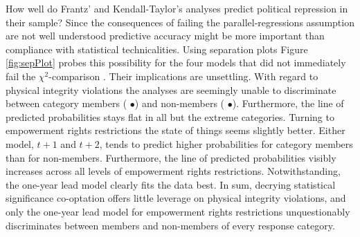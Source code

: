 How well do Frantz' and Kendall-Taylor's analyses predict 
political repression in their sample? Since the consequences
of failing the parallel-regressions assumption are not well 
understood predictive accuracy might be more important than
compliance with statistical technicalities. Using separation 
plots Figure \ref{fig:sepPlot} probes this possibility for 
the four models that did not immediately fail the 
$\chi^2$-comparison \citep{Greenhill.2011}.
Their implications are unsettling. With regard to 
physical integrity violations the analyses are 
seemingly unable to discriminate between category 
members ({\color{darkgrey} $\bullet$}) and 
non-members ({\color{lightgrey} $\bullet$}). 
Furthermore, the line of predicted probabilities stays flat 
in all but the extreme categories. Turning to empowerment 
rights restrictions the state of things seems slightly 
better. Either model, $t+1$ and $t+2$, tends to predict 
higher probabilities for category members than for 
non-members. Furthermore, the line of predicted 
probabilities visibly increases across all levels of 
empowerment rights restrictions. Notwithstanding, the one-year 
lead model clearly fits the data best. In sum, decrying 
statistical significance co-optation offers little leverage 
on physical integrity violations, and only the one-year lead 
model for empowerment rights restrictions unquestionably
discriminates between members and non-members of every 
response category.

